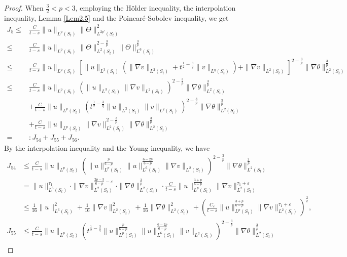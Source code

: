 \documentclass[11pt,reqno]{amsart}
\numberwithin{Thm}{section}
\begin{document}
\begin{proof}
When $\frac{3}{2} < p < 3$, employing the H\"{o}lder inequality, the interpolation inequality, Lemma \ref{Lem2.5} and the Poincar\'{e}-Sobolev inequality, we get
\begin{align*}
J_5\leq&\frac{C}{t-s}\|u\|_{L^p(S_t)}\|\Theta\|_{L^{2p'}(S_t)}^2\\
\leq&\frac{C}{t-s}\|u\|_{L^p(S_t)}\|\Theta\|_{L^2(S_t)}^{2-\frac{3}{p}}\|\Theta\|_{L^6(S_t)}^{\frac{3}{p}}\\
\leq&\frac{C}{t-s}\|u\|_{L^p(S_t)}\left[\|u\|_{L^3(S_t)}\left(\|\nabla v\|_{L^2(S_t)}+t^{\frac{1}{2}-\frac{3}{q}}\|v\|_{L^q(S_t)}\right)+\|\nabla v\|_{L^2(S_t)}\right]^{2-\frac{3}{p}}\|\nabla\theta\|_{L^2(S_t)}^{\frac{3}{p}}\\
\leq&\frac{C}{t-s}\|u\|_{L^p(S_t)}\left(\|u\|_{L^3(S_t)}\|\nabla v\|_{L^2(S_t)}\right)^{2-\frac{3}{p}}\|\nabla\theta\|_{L^2(S_t)}^{\frac{3}{p}}\\
&+\frac{C}{t-s}\|u\|_{L^p(S_t)}\left(t^{\frac{1}{2}-\frac{3}{q}}\|u\|_{L^3(S_t)}\|v\|_{L^q(S_t)}\right)^{2-\frac{3}{p}}\|\nabla\theta\|_{L^2(S_t)}^{\frac{3}{p}}\\
&+\frac{C}{t-s}\|u\|_{L^p(S_t)}\|\nabla v\|_{L^2(S_t)}^{2-\frac{3}{p}}\|\nabla\theta\|_{L^2(S_t)}^{\frac{3}{p}}\\
=&:J_{54}+J_{55}+J_{56}.
\end{align*}
By the interpolation inequality and the Young inequality, we have
\begin{align*}
J_{54}&\leq\frac{C}{t-s}\|u\|_{L^p(S_t)}\left(\|u\|_{L^p(S_t)}^{\frac{p}{6-p}}\|u\|_{L^6(S_t)}^{\frac{6-2p}{6-p}}\|\nabla v\|_{L^2(S_t)}\right)^{2-\frac{3}{p}}\|\nabla\theta\|_{L^2(S_t)}^{\frac{3}{p}}\\
&=\|u\|_{L^6(S_t)}^{\tau_1}\cdot\|\nabla v\|_{L^2(S_t)}^{\frac{2p-3}{6-p}-\varepsilon}\cdot\|\nabla\theta\|_{L^2(S_t)}^{\frac{3}{p}}\cdot\frac{C}{t-s}\|u\|_{L^p(S_t)}^\frac{3+p}{6-p}\|\nabla v\|_{L^2(S_t)}^{\tau_1+\varepsilon}\\
&\leq\frac{1}{16}\|u\|_{L^6(S_t)}^2+\frac{1}{16}\|\nabla v\|_{L^2(S_t)}^2+\frac{1}{16}\|\nabla\theta\|_{L^2(S_t)}^2+\left(\frac{C_\varepsilon}{t-s}\|u\|_{L^p(S_t)}^\frac{3+p}{6-p}\|\nabla v\|_{L^2(S_t)}^{\tau_1+\varepsilon}\right)^\frac{2}{\varepsilon},
\end{align*}
\begin{align*}
J_{55}&\leq\frac{C}{t-s}\|u\|_{L^p(S_t)}\left(t^{\frac{1}{2}-\frac{3}{q}}\|u\|_{L^p(S_t)}^{\frac{p}{6-p}}\|u\|_{L^6(S_t)}^{\frac{6-2p}{6-p}}\|v\|_{L^q(S_t)} \right)^{2-\frac{3}{p}}\|\nabla\theta\|_{L^2(S_t)}^{\frac{3}{p}}\\

\end{align*}
\end{proof}
\end{document}
